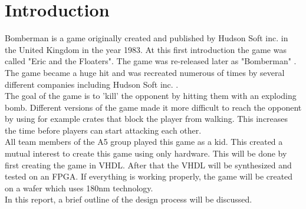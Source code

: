 \section{Introduction}
Bomberman is a game originally created and published by Hudson Soft inc. in the United Kingdom in the year 1983. At this first introduction the game was called "Eric and the Floaters". The game was re-released later as "Bomberman" . The game became a huge hit and was recreated numerous of times by several different companies including Hudson Soft inc. \cite{mobygames}.\\

The goal of the game is to 'kill' the opponent by hitting them with an exploding bomb. Different versions of the game made it more difficult to reach the opponent by using for example crates that block the player from walking. This increases the time before players can start attacking each other.\\

All team members of the A5 group played this game as a kid. This created a mutual interest to create this game using only hardware. This will be done by first creating the game in VHDL. After that the VHDL will be synthesized and tested on an FPGA. If everything is working properly, the game will be created on a wafer which uses 180nm technology. \\%

In this report, a brief outline of the design process will be discussed.\\




